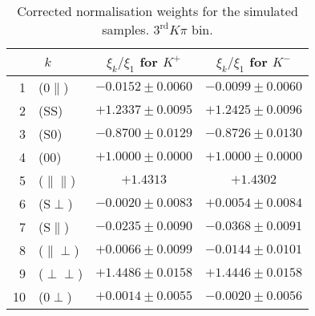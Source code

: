 \begin{table}[hbtp]
\center\footnotesize
  \caption{\small Corrected normalisation weights for the simulated samples. $3^{\text{rd}}K\pi$ bin.}
  \center
  \begin{tabular}{r l c c}
    \multicolumn{2}{c}{$k$}       & $\xi_k/\xi_1$ for $K^+$    &  $\xi_k/\xi_1$ for $K^-$        \\
    \hline
     1  &  ($0\parallel$)         & $ -0.0152 \pm 0.0060 $ & $ -0.0099 \pm 0.0060 $    \\
     2  &  (SS)                   & $ +1.2337 \pm 0.0095 $ & $ +1.2425 \pm 0.0096 $    \\
     3  &  (S0)                   & $ -0.8700 \pm 0.0129 $ & $ -0.8726 \pm 0.0130 $    \\
     4  &  (00)                   & $ +1.0000 \pm 0.0000 $ & $ +1.0000 \pm 0.0000 $    \\
     5  &  ($\parallel\parallel$) & $ +1.4313            $ & $ +1.4302            $    \\
     6  &  (S$\perp$)             & $ -0.0020 \pm 0.0083 $ & $ +0.0054 \pm 0.0084 $    \\
     7  &  (S$\parallel$)         & $ -0.0235 \pm 0.0090 $ & $ -0.0368 \pm 0.0091 $    \\
     8  &  ($\parallel\perp$)     & $ +0.0066 \pm 0.0099 $ & $ -0.0144 \pm 0.0101 $    \\
     9  &  ($\perp\perp$)         & $ +1.4486 \pm 0.0158 $ & $ +1.4446 \pm 0.0158 $    \\
    10  &  ($0\perp$)             & $ +0.0014 \pm 0.0055 $ & $ -0.0020 \pm 0.0056 $    \\
    \hline                                                   
  \end{tabular}
\end{table}
 

